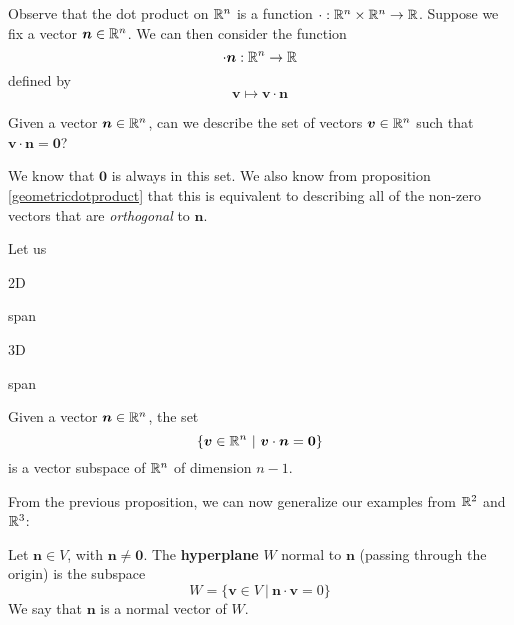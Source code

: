 

Observe that the dot product on $\mathbb{R}^n$ is a function $\cdot: \mathbb{R}^n \times \mathbb{R}^n \to \mathbb{R}$.  Suppose we fix a vector $\bm{n} \in \mathbb{R}^n$.  We can then consider the function $$\cdot \bm{n} : \mathbb{R}^n\to \mathbb{R}$$ defined by $$\bm{v} \mapsto \bm{v} \cdot \bm{n}$$






\begin{motivating}
Given a vector $\bm{n} \in \mathbb{R}^n$, can we describe the set of vectors $\bm{v} \in \mathbb{R}^n$ such that $\bm{v} \cdot \bm{n} = \bm{0}$?
\end{motivating}

We know that $\bm{0}$ is always in this set.  We also know  from proposition \ref{geometricdotproduct} that this is equivalent to describing all of the non-zero vectors that are \textit{orthogonal} to $\bm{n}$. 

Let us 

\begin{example}
    2D
    
    span
\end{example}

\begin{example}
    3D 
    
    span
\end{example}


\begin{proposition}
    Given a vector $\bm{n} \in \mathbb{R}^n$, the set $$\{\bm{v} \in \mathbb{R}^n \ | \ \bm{v} \cdot \bm{n} = \bm{0}\}$$ is a vector subspace of $\mathbb{R}^n$ of dimension $n-1$.
\end{proposition}


From the previous proposition, we can now generalize our examples from $\mathbb{R}^2$ and $\mathbb{R}^3$:

\begin{definition}
Let $\bm{n} \in V$, with $\bm{n} \neq \bm{0}$.  The \textbf{hyperplane} $W$ normal to $\bm{n}$ (passing through the origin) is the subspace $$W = \{ \bm{v} \in V \ | \ \bm{n} \cdot \bm{v}  = 0 \}$$
We say that $\bm{n}$ is a normal vector of $W$.
\end{definition}









